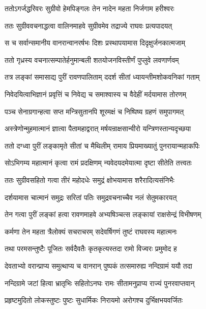 \twolineshloka
{ततोऽगर्जद्धरिवरः सुग्रीवो हेमपिङ्गलः}
{तेन नादेन महता निर्जगाम हरीश्वरः} %

\twolineshloka
{ततः सुग्रीववचनाद्धत्वा वालिनमाहवे}
{सुग्रीवमेव तद्राज्ये राघवः प्रत्यपादयत्} %

\twolineshloka
{स च सर्वान्समानीय वानरान्वानरर्षभः}
{दिशः प्रस्थापयामास दिदृक्षुर्जनकात्मजाम्} %

\twolineshloka
{ततो गृध्रस्य वचनात्सम्पातेर्हनुमान्बली}
{शतयोजनविस्तीर्णं पुप्लुवे लवणार्णवम्} %

\twolineshloka
{तत्र लङ्कां समासाद्य पुरीं रावणपालिताम्}
{ददर्श सीतां ध्यायन्तीमशोकवनिकां गताम्} %

\twolineshloka
{निवेदयित्वाभिज्ञानं प्रवृत्तिं च निवेद्य च}
{समाश्वास्य च वैदेहीं मर्दयामास तोरणम्} %

\twolineshloka
{पञ्च सेनाग्रगान्हत्वा सप्त मन्त्रिसुतानपि}
{शूरमक्षं च निष्पिष्य ग्रहणं समुपागमत्} %

\twolineshloka
{अस्त्रेणोन्मुहमात्मानं ज्ञात्वा पैतामहाद्वरात्}
{मर्षयन्राक्षसान्वीरो यन्त्रिणस्तान्यदृच्छया} %

\twolineshloka
{ततो दग्ध्वा पुरीं लङ्कामृते सीतां च मैथिलीम्}
{रामाय प्रियमाख्यातुं पुनरायान्महाकपिः} %

\twolineshloka
{सोऽभिगम्य महात्मानं कृत्वा रामं प्रदक्षिणम्}
{न्यवेदयदमेयात्मा दृष्टा सीतेति तत्त्वतः} %

\twolineshloka
{ततः सुग्रीवसहितो गत्वा तीरं महोदधेः}
{समुद्रं क्षोभयामास शरैरादित्यसंनिभैः} %

\twolineshloka
{दर्शयामास चात्मानं समुद्रः सरितां पतिः}
{समुद्रवचनाच्चैव नलं सेतुमकारयत्} %

\twolineshloka
{तेन गत्वा पुरीं लङ्कां हत्वा रावणमाहवे}
{अभ्यषिञ्चत्स लङ्कायां राक्षसेन्द्रं विभीषणम्} %

\twolineshloka
{कर्मणा तेन महता त्रैलोक्यं सचराचरम्}
{सदेवर्षिगणं तुष्टं राघवस्य महात्मनः} %

\twolineshloka
{तथा परमसन्तुष्टैः पूजितः सर्वदैवतैः}
{कृतकृत्यस्तदा रामो विज्वरः प्रमुमोद ह} %

\twolineshloka
{देवताभ्यो वरान्प्राप्य समुत्थाप्य च वानरान्}
{पुष्पकं तत्समारुह्य नन्दिग्रामं ययौ तदा} %

\twolineshloka
{नन्दिग्रामे जटां हित्वा भ्रातृभिः सहितोऽनघः}
{रामः सीतामनुप्राप्य राज्यं पुनरवाप्तवान्} %

\twolineshloka
{प्रहृष्टमुदितो लोकस्तुष्टः पुष्टः सुधार्मिकः}
{निरायमो अरोगश्च दुर्भिक्षभयवर्जितः} %

